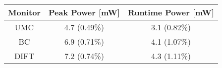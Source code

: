 

\begin{tabular}{|c|c|c|}
\hline

{\bf Monitor} & {\bf Peak Power [mW]} & {\bf Runtime Power [mW]} \\ \hline\hline

UMC  & 4.7 (0.49\%) &  3.1 (0.82\%) \\ \hline
BC   & 6.9 (0.71\%) &  4.1 (1.07\%) \\ \hline
DIFT & 7.2 (0.74\%) &  4.3 (1.11\%) \\ \hline

\end{tabular}
